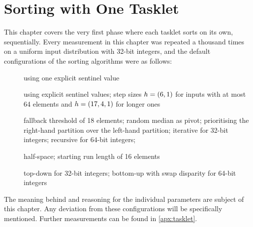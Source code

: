 \chapter{Sorting with One Tasklet}
\label{sec:tasklet}

This chapter covers the very first phase where each tasklet sorts on its own, \ie{} sequentially.
Every measurement in this chapter was repeated a thousand times on a uniform input distribution with 32-bit integers, and the default configurations of the sorting algorithms were as follows:
\begin{description}
	\item[\IS{}]
	using one explicit sentinel value

	\item[\ShS{}]
	using explicit sentinel values;
	step sizes \(h = (6, 1)\) for inputs with at most 64 elements and \(h = (17, 4, 1)\) for longer ones

	\item[\QS{}]
	fallback threshold of 18 elements;
	random median as pivot;
	prioritising the right-hand partition over the left-hand partition;
	iterative for 32-bit integers;
	recursive for 64-bit integers;

	\item[\MS{}]
	half-space;
	starting run length of 16 elements

	\item[\HS{}]
	top-down for 32-bit integers;
	bottom-up with swap disparity for 64-bit integers
\end{description}
The meaning behind and reasoning for the individual parameters are subject of this chapter.
Any deviation from these configurations will be specifically mentioned.
Further measurements can be found in \cref{apx:tasklet}.

\clearpage


\clearpage


\clearpage


\clearpage


\clearpage


\clearpage

